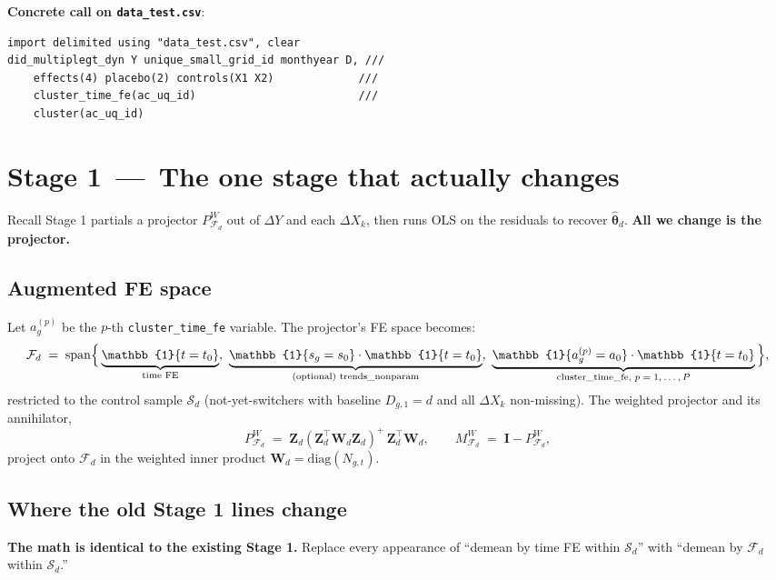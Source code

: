 \documentclass[11pt]{article}
\newcommand{\code}[1]{\texttt{\small #1}}
\newcommand{\1}{\mathbb{1}}
\newcommand{\Smpl}{\mathcal{S}}
\newcommand{\thetad}{\widehat{\bm{\theta}}_d}
\newcommand{\Ngt}{N_{g,t}}
\newcommand{\Pdca}{P^{\!W}_{\mathcal{F}_d}}
\newcommand{\Mdca}{M^{\!W}_{\mathcal{F}_d}}
\begin{document}
\medskip\noindent\textbf{Concrete call on \code{data\_test.csv}}:
\begin{lstlisting}
import delimited using "data_test.csv", clear
did_multiplegt_dyn Y unique_small_grid_id monthyear D, ///
    effects(4) placebo(2) controls(X1 X2)             ///
    cluster_time_fe(ac_uq_id)                         ///
    cluster(ac_uq_id)
\end{lstlisting}

\section[Stage 1 -- The one stage that actually changes]{Stage 1 \,---\, The one stage that actually changes}

Recall Stage 1 partials a projector $\Pdca$ out of $\Delta Y$ and each
$\Delta X_k$, then runs OLS on the residuals to recover $\thetad$.
\textbf{All we change is the projector.}

\subsection*{Augmented FE space}

Let $a^{(p)}_g$ be the $p$-th \code{cluster\_time\_fe} variable. The
projector's FE space becomes:
\begin{equation}
\mathcal{F}_d \;=\; \mathrm{span}\Bigl\{\,
\underbrace{\1\{t=t_0\}}_{\text{time FE}},\
\underbrace{\1\{s_g = s_0\}\cdot\1\{t=t_0\}}_{\text{(optional) trends\_nonparam}},\
\underbrace{\1\{a^{(p)}_g = a_0\}\cdot \1\{t=t_0\}}_{\text{cluster\_time\_fe, $p=1,\dots,P$}}\,\Bigr\},
\label{eq:Fd}
\end{equation}
restricted to the control sample $\Smpl_d$
(not-yet-switchers with baseline $D_{g,1}=d$ and all $\Delta X_k$
non-missing). The weighted projector and its annihilator,
\[
\Pdca \;=\; \bm{Z}_d (\bm{Z}_d^{\top}\bm{W}_d \bm{Z}_d)^{+}\,\bm{Z}_d^{\top}\bm{W}_d,
\qquad
\Mdca \;=\; \bm{I} - \Pdca,
\]
project onto $\mathcal{F}_d$ in the weighted inner product
$\bm{W}_d = \mathrm{diag}(\Ngt)$.

\subsection*{Where the old Stage 1 lines change}

\begin{tcolorbox}[colback=codebg, colframe=ok, boxrule=0.6pt, arc=1pt]
\textbf{The math is identical to the existing Stage 1.} Replace every
appearance of ``demean by time FE within $\Smpl_d$'' with ``demean by
$\mathcal{F}_d$ within $\Smpl_d$.''
\end{tcolorbox}
\end{document}
